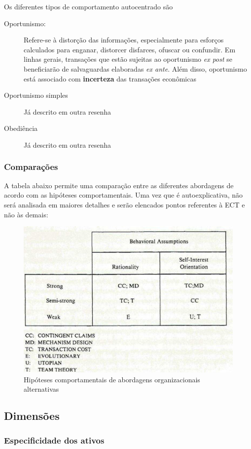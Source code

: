 Os diferentes tipos de comportamento autocentrado são

\begin{description}
	\item[Oportunismo:] Refere-se à distorção das informações, especialmente para esforços calculados para enganar, distorcer disfarces, ofuscar ou confundir. Em linhas gerais, transações que estão sujeitas ao oportunismo \textit{ex post} se beneficiarão de salvaguardas elaboradas \textit{ex ante}. Além disso, oportunismo está associado com \textbf{incerteza} das transações econômicas
	\item[Oportunismo simples] Já descrito em outra resenha
	\item[Obediência] Já descrito em outra resenha
\end{description}


\subsubsection*{Comparações}

A tabela abaixo permite uma comparação entre as diferentes abordagens de acordo com as hipóteses comportamentais. Uma vez que é autoexplicativa, não será analisada em maiores detalhes e serão elencados pontos referentes à ECT e não às demais:

\begin{figure}[H]
	\centering
	\includegraphics[width=0.7\linewidth]{screenshot004}
	\caption{Hipóteses comportamentais de abordagens organizacionais alternativas}
	\label{fig:screenshot004}
\end{figure}

\subsection*{Dimensões}

\subsubsection*{Especificidade dos ativos}

